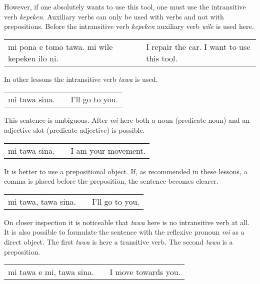 However, if one absolutely wants to use this tool, one must use the intransitive verb \textit{kepeken}. 
Auxiliary verbs can only be used with verbs and not with prepositions. 
Before the intransitive verb \textit{kepeken} auxiliary verb \textit{wile} is used here. 

\begin{supertabular}{p{5,5cm}|ll}
mi pona e tomo tawa. mi wile kepeken ilo ni. && I repair the car. I want to use this tool. \\
\end{supertabular} 

%
%
In other lessons the intransitive verb \textit{tawa} is used.

\begin{supertabular}{p{5,5cm}|ll}
mi tawa sina. && I'll go to you. \\ %
\end{supertabular} 

This sentence is ambiguous. 
After \textit{mi} here both a noun (predicate noun) and an adjective slot (predicate adjective) is possible. 

\begin{supertabular}{p{5,5cm}|ll}
mi tawa sina. && I am your movement. \\ %
\end{supertabular} 

It is better to use a prepositional object.
If, as recommended in these lessons, a comma is placed before the preposition, the sentence becomes clearer.

\begin{supertabular}{p{5,5cm}|ll}
mi tawa, tawa sina. && I'll go to you. \\ 
\end{supertabular} 

On closer inspection it is noticeable that \textit{tawa} here is no intransitive verb at all.
It is also possible to formulate the sentence with the reflexive pronoun \textit{mi} as a direct object. 
The first \textit{tawa} is here a transitive verb. 
The second \textit{tawa} is a preposition. 

\begin{supertabular}{p{5,5cm}|ll}
mi tawa e mi, tawa sina. && I move towards you. \\ %
\end{supertabular} 

